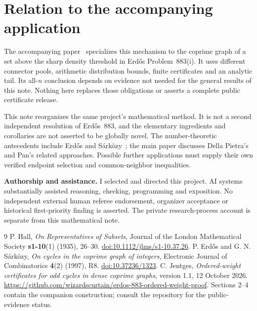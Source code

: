 \documentclass[11pt,letterpaper]{article}
\theoremstyle{remark}\newtheorem{remark}[theorem]{Remark}
\begin{document}
\section{Relation to the accompanying application}
The accompanying paper~\cite{Jentges} specializes this mechanism to the coprime graph of a set above the sharp density threshold in Erd\H{o}s Problem~883(i). It uses different connector pools, arithmetic distribution bounds, finite certificates and an analytic tail. Its all-$n$ conclusion depends on evidence not needed for the general results of this note. Nothing here replaces those obligations or asserts a complete public certificate release.

This note reorganizes the same project's mathematical method. It is not a second independent resolution of Erd\H{o}s~883, and the elementary ingredients and corollaries are not asserted to be globally novel. The number-theoretic antecedents include Erd\H{o}s and S\'ark\"ozy~\cite{ES97}; the main paper discusses Della Pietra's and Pan's related approaches. Possible further applications must supply their own verified endpoint selection and common-neighbor inequalities.

\medskip
\noindent\textbf{Authorship and assistance.} I selected and directed this project. AI systems substantially assisted reasoning, checking, programming and exposition. No independent external human referee endorsement, organizer acceptance or historical first-priority finding is asserted. The private research-process account is separate from this mathematical note.

\begin{thebibliography}{9}
 P. Hall, \emph{On Representatives of Subsets}, Journal of the London Mathematical Society \textbf{s1-10}(1) (1935), 26--30. \href{https://doi.org/10.1112/jlms/s1-10.37.26}{doi:10.1112/jlms/s1-10.37.26}.
 P. Erd\H{o}s and G. N. S\'ark\"ozy, \emph{On cycles in the coprime graph of integers}, Electronic Journal of Combinatorics \textbf{4}(2) (1997), R8. \href{https://doi.org/10.37236/1323}{doi:10.37236/1323}.
 C. Jentges, \emph{Ordered-weight certificates for odd cycles in dense coprime graphs}, version 1.1, 12 October 2026. \url{https://github.com/wizardscurtain/erdos-883-ordered-weight-proof}. Sections 2--4 contain the companion construction; consult the repository for the public-evidence status.
\end{thebibliography}
\end{document}
